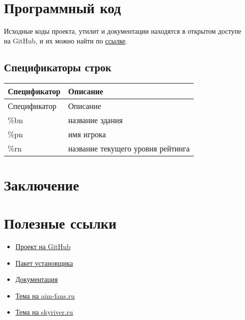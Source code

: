 \documentclass[a4paper,12pt]{report}
\begin{document}
\chapter{Программный код}

Исходные коды проекта, утилит и документации находятся в открытом доступе на GitHub, и их можно найти по \href{https://github.com/aimrebirth}{ссылке}.

\section{Спецификаторы строк}

\begin{longtable}{|l|l|}
\hline

Спецификатор & Описание\\ \hline
\endfirsthead

\hline
Спецификатор & Описание\\ \hline
\endhead

\%bn & название здания \\ \hline
\%pn & имя игрока \\ \hline
\%rn & название текущего уровня рейтинга \\ \hline

\end{longtable}

\chapter*{Заключение}

\chapter*{Полезные ссылки}

\begin{itemize}
\item \href{https://github.com/aimrebirth}{Проект на GitHub}
\item \href{https://www.dropbox.com/s/0zhbgb1ftspcv9w/polygon4.zip?dl=1}{Пакет установщика}
\item \href{https://www.dropbox.com/s/ipnakg5civ0xp0g/Polygon4_ru.pdf?dl=1}{Документация}
\item \href{http://aim-fans.ru/index.php?showtopic=147}{Тема на aim-fans.ru}
\item \href{http://forum.skyriver.ru/viewtopic.php?f=26&t=4801}{Тема на skyriver.ru}
\end{itemize}
\end{document}
